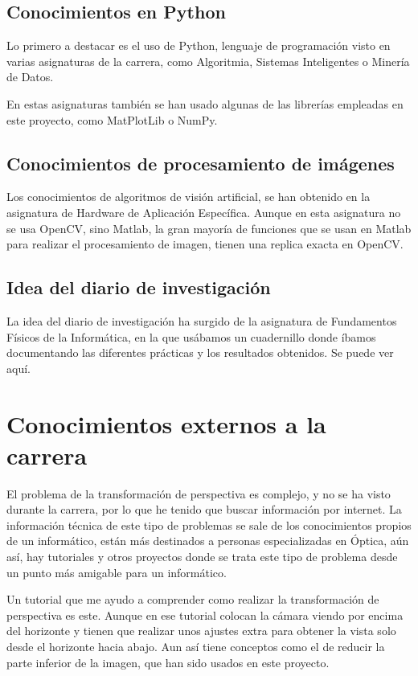 \subsection{Conocimientos en Python}
Lo primero a destacar es el uso de Python, lenguaje de programación visto en varias asignaturas de la carrera, como Algoritmia, Sistemas Inteligentes o Minería de Datos. 

En estas asignaturas también se han usado algunas de las librerías empleadas en este proyecto, como MatPlotLib o NumPy.


\subsection{Conocimientos de procesamiento de imágenes}
Los conocimientos de algoritmos de visión artificial, se han obtenido en la asignatura de Hardware de Aplicación Específica. Aunque en esta asignatura no se usa OpenCV, sino Matlab, la gran mayoría de funciones que se usan en Matlab para realizar el procesamiento de imagen, tienen una replica exacta en OpenCV.

\subsection{Idea del diario de investigación}
La idea del diario de investigación ha surgido de la asignatura de Fundamentos Físicos de la Informática, en la que usábamos un cuadernillo donde íbamos documentando las diferentes prácticas y los resultados obtenidos. Se puede ver aquí\cite{diario}.

\section{Conocimientos externos a la carrera}

El problema de la transformación de perspectiva es complejo, y no se ha visto durante la carrera, por lo que he tenido que buscar información por internet. La información técnica de este tipo de problemas se sale de los conocimientos propios de un informático, están más destinados a personas especializadas en Óptica, aún así, hay tutoriales y otros proyectos donde se trata este tipo de problema desde un punto más amigable para un informático. 

Un tutorial que me ayudo a comprender como realizar la transformación de perspectiva es este\cite{coord_persp}. Aunque en ese tutorial colocan la cámara viendo por encima del horizonte y tienen que realizar unos ajustes extra para obtener la vista solo desde el horizonte hacia abajo. Aun así tiene conceptos como el de reducir la parte inferior de la imagen, que han sido usados en este proyecto.



